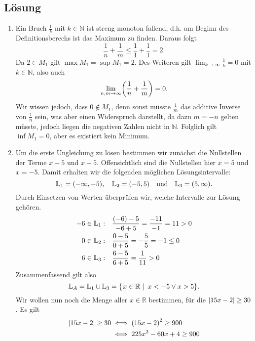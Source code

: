 \documentclass[german,12pt]{homework}
\newcommand{\NN}{\mathbb{N}}
\newcommand{\RR}{\mathbb{R}}
\newcommand{\LL}{\mathbb{L}}
\DeclarePairedDelimiter{\absolute}{\lvert}{\rvert}
\DeclarePairedDelimiter{\enbrace}{(}{)}
\DeclarePairedDelimiter{\penbrace}{\{}{\}}
\begin{document}
    \subsection*{Lösung}
    \begin{enumerate}
        \item Ein Bruch \(\frac{1}{k}\) mit \(k \in \NN\) ist streng monoton
        fallend, d.h. am Beginn des Definitionsberechs ist das Maximum zu
        finden. Daraus folgt
        \[\frac{1}{n} + \frac{1}{m} \le \frac{1}{1} + \frac{1}{1} = 2.\]
        Da \(2 \in M_1\) gilt \(\max{M_1} = \sup{M_1} = 2\). Des Weiteren gilt
        \(\lim_{k \to \infty}\frac{1}{k} = 0\) mit \(k \in \NN\), also auch
        \[\lim_{n, m \to \infty}\enbrace*{\frac{1}{n} + \frac{1}{m}} = 0.\]
        Wir wissen jedoch, dass \(0 \not\in M_1\), denn sonst müsste
        \(\frac{1}{m}\) das additive Inverse von \(\frac{1}{n}\) sein, was aber
        einen Widerspruch darstellt, da dazu \(m = -n\) gelten müsste, jedoch
        liegen die negativen Zahlen nicht in \(\NN\). Folglich gilt \(\inf{M_1}
        = 0\), aber es existiert kein Minimum.
        \item Um die erste Ungleichung zu lösen bestimmen wir zunächst die
        Nullstellen der Terme \(x - 5\) und \(x + 5\). Offensichtlich sind die
        Nullstellen hier \(x = 5\) und \(x = -5\). Damit erhalten wir die
        folgenden möglichen Lösungsintervalle:
        \[\LL_1 = \enbrace*{-\infty, -5}, \quad \LL_2 = \enbrace*{-5, 5} \quad
        \text{und} \quad \LL_3 = \enbrace*{5, \infty}.\]
        Durch Einsetzen von Werten überprüfen wir, welche Intervalle zur Lösung
        gehören.
        \begin{align*}
            -6 \in \LL_1: \quad &\frac{\enbrace*{-6} - 5}{-6 + 5} = \frac{-11}{-
            1} = 11 > 0\\
            0 \in \LL_2: \quad &\frac{0 - 5}{0 + 5} = -\frac{5}{5} = -1 \le 0\\
            6 \in \LL_3: \quad &\frac{6 - 5}{6 + 5} = \frac{1}{11} > 0
        \end{align*}
        Zusammenfassend gilt also
        \[\LL_A = \LL_1 \cup \LL_3 = \penbrace*{\left.x \in \RR\ \right|\ x < -
        5 \lor x > 5}.\]
        Wir wollen nun noch die Menge aller \(x \in \RR\) bestimmen, für die
        \(\absolute*{15x - 2} \ge 30\). Es gilt
        \begin{align*}
            \absolute*{15x - 2} \ge 30 &\iff \enbrace*{15x - 2}^2 \ge 900\\
            &\iff 225x^2 - 60x + 4 \ge 900\\

\end{align*}
\end{enumerate}
\end{document}
